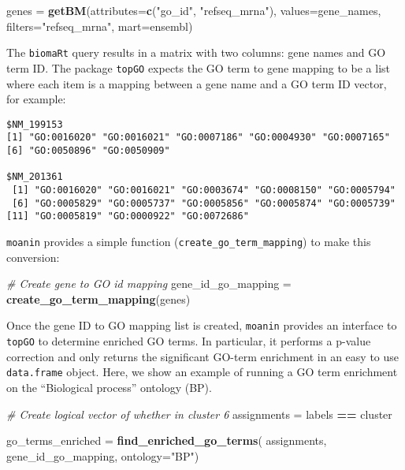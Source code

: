 \documentclass[9pt,a4paper,]{extarticle}
\newenvironment{Shaded}{\begin{snugshade}}{\end{snugshade}}
\newcommand{\CommentTok}[1]{\textcolor[rgb]{0.56,0.35,0.01}{\textit{#1}}}
\newcommand{\DataTypeTok}[1]{\textcolor[rgb]{0.13,0.29,0.53}{#1}}
\newcommand{\KeywordTok}[1]{\textcolor[rgb]{0.13,0.29,0.53}{\textbf{#1}}}
\newcommand{\NormalTok}[1]{#1}
\newcommand{\OperatorTok}[1]{\textcolor[rgb]{0.81,0.36,0.00}{\textbf{#1}}}
\newcommand{\StringTok}[1]{\textcolor[rgb]{0.31,0.60,0.02}{#1}}
\begin{document}
\begin{Shaded}
\begin{Highlighting}[]
\NormalTok{genes =}\StringTok{ }\KeywordTok{getBM}\NormalTok{(}\DataTypeTok{attributes=}\KeywordTok{c}\NormalTok{(}\StringTok{"go_id"}\NormalTok{, }\StringTok{"refseq_mrna"}\NormalTok{),}
          \DataTypeTok{values=}\NormalTok{gene_names,}
          \DataTypeTok{filters=}\StringTok{"refseq_mrna"}\NormalTok{,}
          \DataTypeTok{mart=}\NormalTok{ensembl)}
\end{Highlighting}
\end{Shaded}

The \texttt{biomaRt} query results in a matrix with two columns: gene names and GO
term ID. The package \texttt{topGO} \citep{alexa:topgo} expects the GO term to gene
mapping to be a list where each item is a mapping between a gene name and a GO
term ID vector, for example:

\begin{verbatim}
$NM_199153
[1] "GO:0016020" "GO:0016021" "GO:0007186" "GO:0004930" "GO:0007165"
[6] "GO:0050896" "GO:0050909"

$NM_201361
 [1] "GO:0016020" "GO:0016021" "GO:0003674" "GO:0008150" "GO:0005794"
 [6] "GO:0005829" "GO:0005737" "GO:0005856" "GO:0005874" "GO:0005739"
[11] "GO:0005819" "GO:0000922" "GO:0072686"
\end{verbatim}

\texttt{moanin} provides a simple function (\texttt{create\_go\_term\_mapping}) to make this conversion:

\begin{Shaded}
\begin{Highlighting}[]
\CommentTok{# Create gene to GO id mapping}
\NormalTok{gene_id_go_mapping =}\StringTok{ }\KeywordTok{create_go_term_mapping}\NormalTok{(genes)}
\end{Highlighting}
\end{Shaded}

Once the gene ID to GO mapping list is created, \texttt{moanin} provides an interface
to \texttt{topGO} to determine enriched GO terms. In particular, it performs a
p-value correction and only returns the significant GO-term enrichment in an
easy to use \texttt{data.frame} object. Here, we show an example of running a GO term
enrichment on the ``Biological process'' ontology (BP).

\begin{Shaded}
\begin{Highlighting}[]
\CommentTok{# Create logical vector of whether in cluster 6}
\NormalTok{assignments =}\StringTok{ }\NormalTok{labels }\OperatorTok{==}\StringTok{ }\NormalTok{cluster}

\NormalTok{go_terms_enriched =}\StringTok{ }\KeywordTok{find_enriched_go_terms}\NormalTok{(}
\NormalTok{    assignments,}
\NormalTok{    gene_id_go_mapping, }\DataTypeTok{ontology=}\StringTok{"BP"}\NormalTok{)}
\end{Highlighting}
\end{Shaded}
\end{document}
